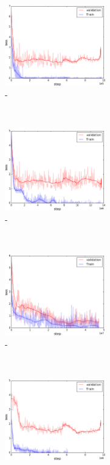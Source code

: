 \begin{figure}[t]
    \centering
    \begin{subfigure}[t]{0.3\textwidth}
        \centering
        \includegraphics[height=3.5cm]{Images/step_m1f1.png}
        \caption{\label{fig:m1f1}\mone-\fone}
    \end{subfigure}%
    ~
    \begin{subfigure}[t]{0.3\textwidth}
        \centering
        \includegraphics[height=3.5cm]{Images/step_m1f2.png}
        \caption{\label{fig:m1f2}\mone-\ftwo}
    \end{subfigure}%
    ~
    \begin{subfigure}[t]{0.3\textwidth}
        \centering
        \includegraphics[height=3.5cm]{Images/step_m1f3.png}
        \caption{\label{fig:m1f3}\mone-\fthree}
    \end{subfigure}%
    \\
    \begin{subfigure}[t]{0.3\textwidth}
        \centering
        \includegraphics[height=3.5cm]{Images/step_m2f1.png}

\end{subfigure}
\end{figure}
